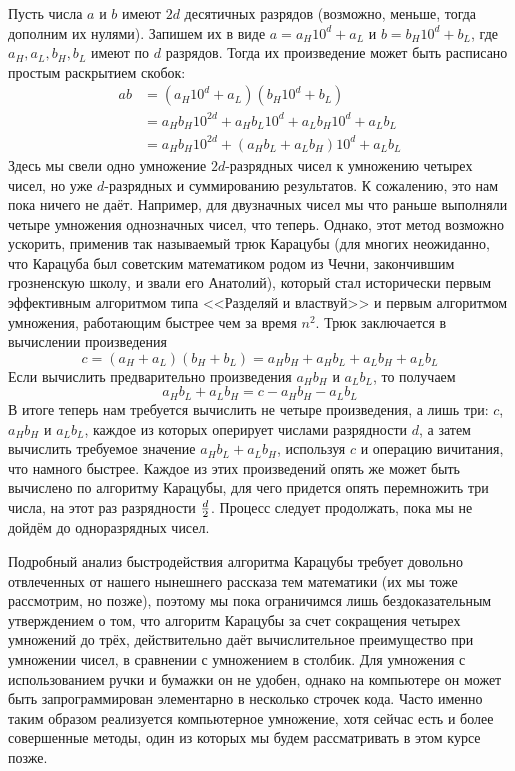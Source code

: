 Пусть числа $a$ и $b$ имеют $2d$ десятичных разрядов (возможно, меньше, тогда дополним их нулями). Запишем их в виде $a = a_H10^d + a_L$ и $b = b_H10^d + b_L$, где $a_H, a_L, b_H, b_L$ имеют по $d$ разрядов. Тогда их произведение может быть расписано простым раскрытием скобок:
\begin{align*}
ab &= (a_H10^d + a_L)(b_H10^d + b_L) \\
         &= a_Hb_H10^{2d} + a_Hb_L10^d + a_Lb_H10^d + a_Lb_L\\
         &= a_Hb_H10^{2d} + (a_Hb_L + a_Lb_H)10^d + a_Lb_L
\end{align*}
Здесь мы свели одно умножение $2d$-разрядных чисел к умножению четырех чисел, но уже $d$-разрядных и суммированию результатов. К сожалению, это нам пока ничего не даёт. Например, для двузначных чисел мы что раньше выполняли четыре умножения однозначных чисел, что теперь. Однако, этот метод возможно ускорить, применив так называемый трюк Карацубы (для многих неожиданно, что Карацуба был советским математиком родом из Чечни, закончившим грозненскую школу, и звали его Анатолий), который стал исторически первым эффективным алгоритмом типа <<Разделяй и властвуй>> и первым алгоритмом умножения, работающим быстрее чем за время $n^2$. Трюк заключается в вычислении произведения
$$c = (a_H + a_L)(b_H + b_L) = a_Hb_H + a_Hb_L + a_Lb_H + a_Lb_L$$
Если вычислить предварительно произведения $a_Hb_H$ и $a_Lb_L$, то получаем
$$a_Hb_L + a_Lb_H = c - a_Hb_H - a_Lb_L$$
В итоге теперь нам требуется вычислить не четыре произведения, а лишь три: $c$, $a_Hb_H$ и $a_Lb_L$, каждое из которых оперирует числами разрядности $d$, а затем вычислить требуемое значение $a_Hb_L + a_Lb_H$, используя $c$ и операцию вичитания, что намного быстрее. Каждое из этих произведений опять же может быть вычислено по алгоритму Карацубы, для чего придется опять перемножить три числа, на этот раз разрядности $d \over 2$. Процесс следует продолжать, пока мы не дойдём до одноразрядных чисел.

Подробный анализ быстродействия алгоритма Карацубы требует довольно отвлеченных от нашего нынешнего рассказа тем математики (их мы тоже рассмотрим, но позже), поэтому мы пока ограничимся лишь бездоказательным утверждением о том, что алгоритм Карацубы за счет сокращения четырех умножений до трёх, действительно даёт вычислительное преимущество при умножении чисел, в сравнении с умножением в столбик. Для умножения с использованием ручки и бумажки он не удобен, однако на компьютере он может быть запрограммирован элементарно в несколько строчек кода. Часто именно таким образом реализуется компьютерное умножение, хотя сейчас есть и более совершенные методы, один из которых мы будем рассматривать в этом курсе позже.

